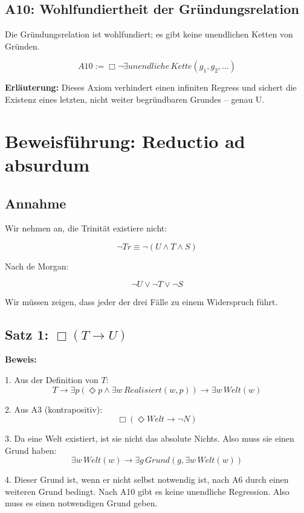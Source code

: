 \documentclass[
]{article}
\begin{document}
\subsection{A10: Wohlfundiertheit der Gründungsrelation}\label{a10-wohlfundiertheit-der-gruxfcndungsrelation}

Die Gründungsrelation ist wohlfundiert; es gibt keine unendlichen Ketten von Gründen.

\[
\boxed{A10 := \Box\neg\exists unendliche\, Kette(g_1, g_2, ...)}
\]

\textbf{Erläuterung:} Dieses Axiom verhindert einen infiniten Regress und sichert die Existenz eines letzten, nicht weiter begründbaren Grundes -- genau U.

\section{Beweisführung: Reductio ad absurdum}\label{beweisfuxfchrung-reductio-ad-absurdum}

\subsection{Annahme}\label{annahme}

Wir nehmen an, die Trinität existiere nicht:

\[
\neg Tr \equiv \neg(U \land T \land S)
\]

Nach de Morgan:

\[
\neg U \lor \neg T \lor \neg S
\]

Wir müssen zeigen, dass jeder der drei Fälle zu einem Widerspruch führt.

\subsection{Satz 1: \(\Box(T \rightarrow U)\)}\label{satz-1-boxt-rightarrow-u}

\textbf{Beweis:}

1. Aus der Definition von \(T\):  
   \[
   T \rightarrow \exists p(\Diamond p \land \exists w\, Realisiert(w,p)) \rightarrow \exists w\, Welt(w)
   \]

2. Aus A3 (kontrapositiv):  
   \[
   \Box(\Diamond Welt \rightarrow \neg N)
   \]

3. Da eine Welt existiert, ist sie nicht das absolute Nichts. Also muss sie einen Grund haben:  
   \[
   \exists w\, Welt(w) \rightarrow \exists g\, Grund(g, \exists w\, Welt(w))
   \]

4. Dieser Grund ist, wenn er nicht selbst notwendig ist, nach A6 durch einen weiteren Grund bedingt. Nach A10 gibt es keine unendliche Regression. Also muss es einen notwendigen Grund geben.
\end{document}
